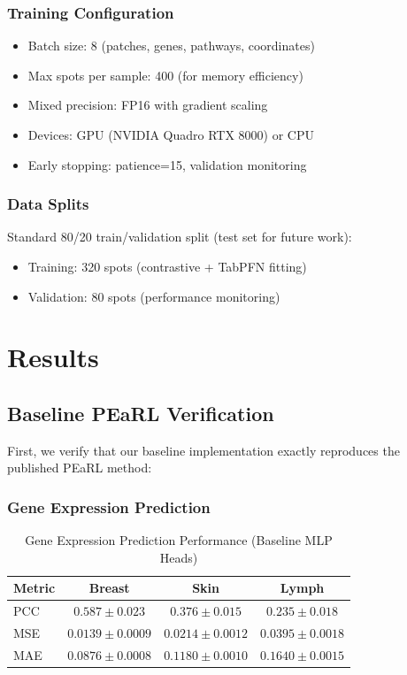 \documentclass[conference]{IEEEtran}
\begin{document}
\subsubsection{Training Configuration}
\begin{itemize}
\item Batch size: 8 (patches, genes, pathways, coordinates)
\item Max spots per sample: 400 (for memory efficiency)
\item Mixed precision: FP16 with gradient scaling
\item Devices: GPU (NVIDIA Quadro RTX 8000) or CPU
\item Early stopping: patience=15, validation monitoring
\end{itemize}

\subsubsection{Data Splits}
Standard 80/20 train/validation split (test set for future work):
\begin{itemize}
\item Training: 320 spots (contrastive + TabPFN fitting)
\item Validation: 80 spots (performance monitoring)
\end{itemize}

\section{Results}

\subsection{Baseline PEaRL Verification}

First, we verify that our baseline implementation exactly reproduces the published PEaRL method:

\subsubsection{Gene Expression Prediction}
\begin{table}[h]
\centering
\caption{Gene Expression Prediction Performance (Baseline MLP Heads)}
\begin{tabular}{lccc}
\toprule
\textbf{Metric} & \textbf{Breast} & \textbf{Skin} & \textbf{Lymph} \\
\midrule
PCC & $0.587 \pm 0.023$ & $0.376 \pm 0.015$ & $0.235 \pm 0.018$ \\
MSE & $0.0139 \pm 0.0009$ & $0.0214 \pm 0.0012$ & $0.0395 \pm 0.0018$ \\
MAE & $0.0876 \pm 0.0008$ & $0.1180 \pm 0.0010$ & $0.1640 \pm 0.0015$ \\
\bottomrule
\end{tabular}
\end{table}
\end{document}

